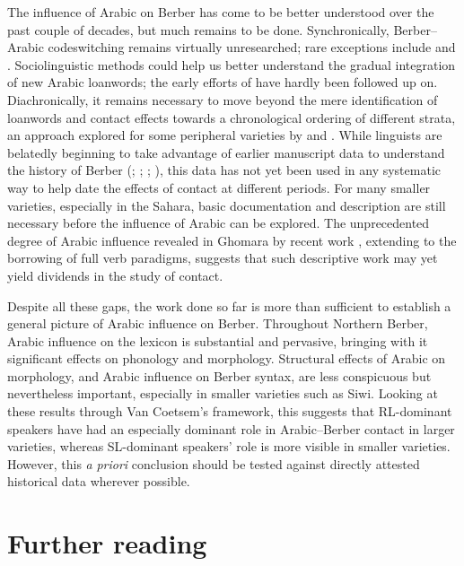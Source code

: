 \documentclass[output=paper]{langsci/langscibook}
\begin{document}
The influence of Arabic on Berber has come to be better understood over the past couple of decades, but much remains to be done.  Synchronically, Berber–Arabic codeswitching remains virtually unresearched; rare exceptions include \citet{Hamza2007} and \citet{Kossmann2012}. Sociolinguistic methods could help us better understand the gradual integration of new Arabic loanwords; the early efforts of \citet{Brahimi2000} have hardly been followed up on. Diachronically, it remains necessary to move beyond the mere identification of loanwords and contact effects towards a chronological ordering of different strata, an approach explored for some peripheral varieties by \citet{Souag2009} and \citet{vanPuttenBenkato2017}. While linguists are belatedly beginning to take advantage of earlier manuscript data to understand the history of Berber (\citealt{Boogert1997}; \citealt{Boogert1998}; \citealt{Brugnatelli2011}; \citealt{Meouak2015}), this data has not yet been used in any systematic way to help date the effects of contact at different periods. For many smaller varieties, especially in the Sahara, basic documentation and description are still necessary before the influence of Arabic can be explored. The unprecedented degree of Arabic influence revealed in Ghomara by recent work \citep{Mourigh2016}, extending to the borrowing of full verb paradigms, suggests that such descriptive work may yet yield dividends in the study of contact.

Despite all these gaps, the work done so far is more than sufficient to establish a general picture of Arabic influence on Berber. Throughout Northern Berber, Arabic influence on the lexicon is substantial and pervasive, bringing with it significant effects on phonology and morphology. Structural effects of Arabic on morphology, and Arabic influence on Berber syntax, are less conspicuous but nevertheless important, especially in smaller varieties such as Siwi. Looking at these results through Van Coetsem's framework, this suggests that RL-dominant speakers have had an especially dominant role in Arabic–Berber contact in larger varieties, whereas SL-dominant speakers' role is more visible in smaller varieties.  However, this \textit{a} \textit{priori} conclusion should be tested against directly attested historical data wherever possible.

\section*{Further reading}
\end{document}

